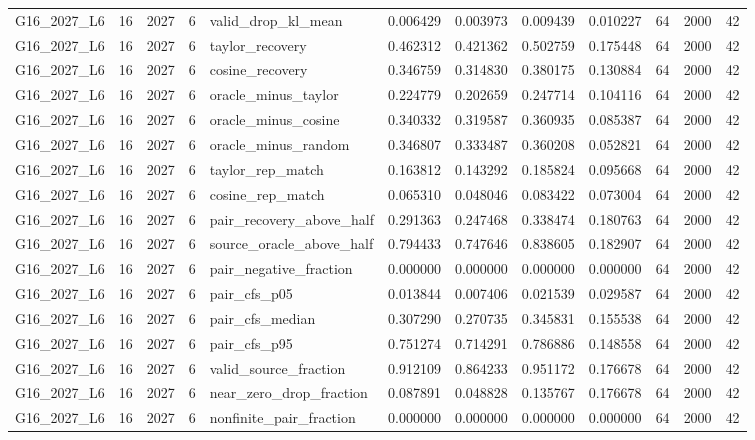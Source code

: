 \begin{tabular}{lrlrlrrrrrrr}
G16_2027_L6 & 16 & 2027 & 6 & valid_drop_kl_mean & 0.006429 & 0.003973 & 0.009439 & 0.010227 & 64 & 2000 & 42 \\
G16_2027_L6 & 16 & 2027 & 6 & taylor_recovery & 0.462312 & 0.421362 & 0.502759 & 0.175448 & 64 & 2000 & 42 \\
G16_2027_L6 & 16 & 2027 & 6 & cosine_recovery & 0.346759 & 0.314830 & 0.380175 & 0.130884 & 64 & 2000 & 42 \\
G16_2027_L6 & 16 & 2027 & 6 & oracle_minus_taylor & 0.224779 & 0.202659 & 0.247714 & 0.104116 & 64 & 2000 & 42 \\
G16_2027_L6 & 16 & 2027 & 6 & oracle_minus_cosine & 0.340332 & 0.319587 & 0.360935 & 0.085387 & 64 & 2000 & 42 \\
G16_2027_L6 & 16 & 2027 & 6 & oracle_minus_random & 0.346807 & 0.333487 & 0.360208 & 0.052821 & 64 & 2000 & 42 \\
G16_2027_L6 & 16 & 2027 & 6 & taylor_rep_match & 0.163812 & 0.143292 & 0.185824 & 0.095668 & 64 & 2000 & 42 \\
G16_2027_L6 & 16 & 2027 & 6 & cosine_rep_match & 0.065310 & 0.048046 & 0.083422 & 0.073004 & 64 & 2000 & 42 \\
G16_2027_L6 & 16 & 2027 & 6 & pair_recovery_above_half & 0.291363 & 0.247468 & 0.338474 & 0.180763 & 64 & 2000 & 42 \\
G16_2027_L6 & 16 & 2027 & 6 & source_oracle_above_half & 0.794433 & 0.747646 & 0.838605 & 0.182907 & 64 & 2000 & 42 \\
G16_2027_L6 & 16 & 2027 & 6 & pair_negative_fraction & 0.000000 & 0.000000 & 0.000000 & 0.000000 & 64 & 2000 & 42 \\
G16_2027_L6 & 16 & 2027 & 6 & pair_cfs_p05 & 0.013844 & 0.007406 & 0.021539 & 0.029587 & 64 & 2000 & 42 \\
G16_2027_L6 & 16 & 2027 & 6 & pair_cfs_median & 0.307290 & 0.270735 & 0.345831 & 0.155538 & 64 & 2000 & 42 \\
G16_2027_L6 & 16 & 2027 & 6 & pair_cfs_p95 & 0.751274 & 0.714291 & 0.786886 & 0.148558 & 64 & 2000 & 42 \\
G16_2027_L6 & 16 & 2027 & 6 & valid_source_fraction & 0.912109 & 0.864233 & 0.951172 & 0.176678 & 64 & 2000 & 42 \\
G16_2027_L6 & 16 & 2027 & 6 & near_zero_drop_fraction & 0.087891 & 0.048828 & 0.135767 & 0.176678 & 64 & 2000 & 42 \\
G16_2027_L6 & 16 & 2027 & 6 & nonfinite_pair_fraction & 0.000000 & 0.000000 & 0.000000 & 0.000000 & 64 & 2000 & 42 \\

\end{tabular}
